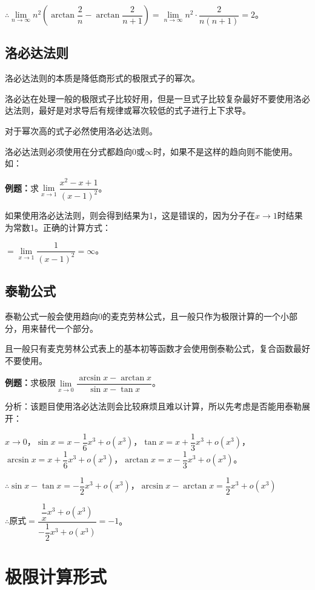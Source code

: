 \documentclass[UTF8, 12pt]{ctexart}
\begin{document}
$\therefore\lim\limits_{n\to\infty}n^2\left(\arctan\dfrac{2}{n}-\arctan\dfrac{2}{n+1}\right)=\lim\limits_{n\to\infty}n^2\cdot\dfrac{2}{n(n+1)}=2$。

\subsection{洛必达法则}

洛必达法则的本质是降低商形式的极限式子的幂次。

洛必达在处理一般的极限式子比较好用，但是一旦式子比较复杂最好不要使用洛必达法则，最好是对求导后有规律或幂次较低的式子进行上下求导。

对于幂次高的式子必然使用洛必达法则。

洛必达法则必须使用在分式都趋向0或$\infty$时，如果不是这样的趋向则不能使用。如：

\textbf{例题：}求$\lim\limits_{x\to 1}\dfrac{x^2-x+1}{(x-1)^2}$。

如果使用洛必达法则，则会得到结果为1，这是错误的，因为分子在$x\to 1$时结果为常数1。正确的计算方式：

$=\lim\limits_{x\to 1}\dfrac{1}{(x-1)^2}=\infty$。

\subsection{泰勒公式}

泰勒公式一般会使用趋向0的麦克劳林公式，且一般只作为极限计算的一个小部分，用来替代一个部分。

且一般只有麦克劳林公式表上的基本初等函数才会使用倒泰勒公式，复合函数最好不要使用。

\textbf{例题：}求极限$\lim\limits_{x\to 0}\dfrac{\arcsin x-\arctan x}{\sin x-\tan x}$。\medskip

分析：该题目使用洛必达法则会比较麻烦且难以计算，所以先考虑是否能用泰勒展开：

$x\to 0$，$\sin x=x-\dfrac{1}{6}x^3+o(x^3)$，$\tan x=x+\dfrac{1}{3}x^3+o(x^3)$，$\arcsin x=x+\dfrac{1}{6}x^3+o(x^3)$，$\arctan x=x-\dfrac{1}{3}x^3+o(x^3)$。

$\therefore \sin x-\tan x=-\dfrac{1}{2}x^3+o(x^3)$，$\arcsin x-\arctan x=\dfrac{1}{2}x^3+o(x^3)$

$\therefore \text{原式}=\dfrac{\dfrac{1}{x}x^3+o(x^3)}{-\dfrac{1}{2}x^3+o(x^3)}=-1$。

\section{极限计算形式}
\end{document}
